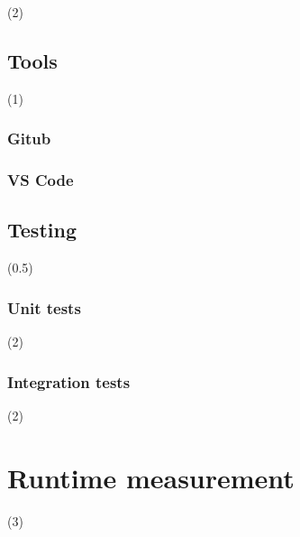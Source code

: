 (2)

\section{Tools}

(1)

\subsection{Gitub}

\subsection{VS Code}

\section{Testing}

(0.5)

\subsection{Unit tests}

(2)

\subsection{Integration tests}

(2)

\chapter{Runtime measurement}
\label{appx:simulation}

(3)